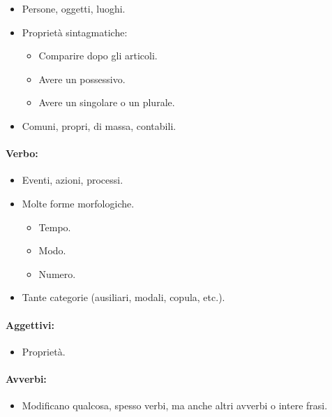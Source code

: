 \begin{itemize}
  \item Persone, oggetti, luoghi. 
  \item Proprietà sintagmatiche: 
    \begin{itemize}
      \item Comparire dopo gli articoli. 
      \item Avere un possessivo. 
      \item Avere un singolare o un plurale.
    \end{itemize}
  \item Comuni, propri, di massa, contabili.
\end{itemize}

\paragraph{Verbo:}

\begin{itemize}
  \item Eventi, azioni, processi. 
  \item Molte forme morfologiche. 
  \begin{itemize}
    \item Tempo. 
    \item Modo. 
    \item Numero.
  \end{itemize}
\item Tante categorie (ausiliari, modali, copula, etc.).
\end{itemize}

\paragraph{Aggettivi:}

\begin{itemize}
  \item Proprietà. 
\end{itemize}

\paragraph{Avverbi:}

\begin{itemize}
  \item Modificano qualcosa, spesso verbi, ma anche altri avverbi o intere frasi.
\end{itemize}


